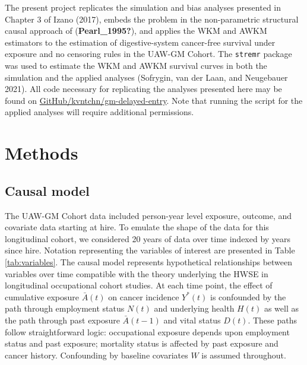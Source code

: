 \documentclass[
  11pt,
]{article}
\begin{document}
The present project replicates the simulation and bias analyses
presented in Chapter 3 of Izano (2017), embeds the problem in the
non-parametric structural causal approach of (\textbf{Pearl\_1995?}),
and applies the WKM and AWKM estimators to the estimation of
digestive-system cancer-free survival under exposure and no censoring
rules in the UAW-GM Cohort. The \texttt{stremr} package was used to
estimate the WKM and AWKM survival curves in both the simulation and the
applied analyses (Sofrygin, van der Laan, and Neugebauer 2021). All code
necessary for replicating the analyses presented here may be found on
\href{https://github.com/kvntchn/gm-delayed-entry.git}{GitHub/kvntchn/gm-delayed-entry}.
Note that running the script for the applied analyses will require
additional permissions.

\hypertarget{methods}{%
\section{Methods}\label{methods}}

\hypertarget{causal-model}{%
\subsection{Causal model}\label{causal-model}}

The UAW-GM Cohort data included person-year level exposure, outcome, and
covariate data starting at hire. To emulate the shape of the data for
this longitudinal cohort, we considered 20 years of data over time
indexed by years since hire. Notation representing the variables of
interest are presented in Table \ref{tab:variables}. The causal model
represents hypothetical relationships between variables over time
compatible with the theory underlying the HWSE in longitudinal
occupational cohort studies. At each time point, the effect of
cumulative exposure \(\bar A(t)\) on cancer incidence \(Y^*(t)\) is
confounded by the path through employment status \(N(t)\) and underlying
health \(H(t)\) as well as the path through past exposure
\(\bar A(t - 1)\) and vital status \(D(t)\). These paths follow
straightforward logic: occupational exposure depends upon employment
status and past exposure; mortality status is affected by past exposure
and cancer history. Confounding by baseline covariates \(W\) is assumed
throughout.
\end{document}
